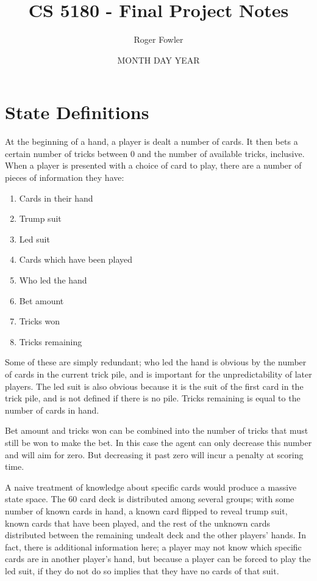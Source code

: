 \documentclass[10pt]{article} %
\title{\vspace{-2cm}CS 5180 - Final Project Notes}
\author{Roger Fowler}
\date{MONTH DAY YEAR}
\begin{document}
\maketitle

\section{State Definitions}

At the beginning of a hand, a player is dealt a number of cards. It then bets a certain number of tricks between 0 and the number of available tricks, inclusive. When a player is presented with a choice of card to play, there are a number of pieces of information they have:

\begin{enumerate}
\item Cards in their hand
\item Trump suit
\item Led suit
\item Cards which have been played
\item Who led the hand
\item Bet amount
\item Tricks won
\item Tricks remaining
\end{enumerate}

Some of these are simply redundant; who led the hand is obvious by the number of cards in the current trick pile, and is important for the unpredictability of later players. The led suit is also obvious because it is the suit of the first card in the trick pile, and is not defined if there is no pile. Tricks remaining is equal to the number of cards in hand.

Bet amount and tricks won can be combined into the number of tricks that must still be won to make the bet. In this case the agent can only decrease this number and will aim for zero. But decreasing it past zero will incur a penalty at scoring time.

A naive treatment of knowledge about specific cards would produce a massive state space. The 60 card deck is distributed among several groups; with some number of known cards in hand, a known card flipped to reveal trump suit, known cards that have been played, and the rest of the unknown cards distributed between the remaining undealt deck and the other players’ hands. In fact, there is additional information here; a player may not know which specific cards are in another player’s hand, but because a player can be forced to play the led suit, if they do not do so implies that they have no cards of that suit.
\end{document}
